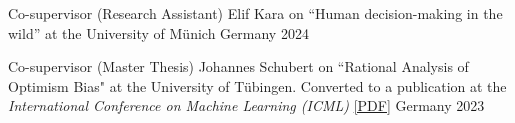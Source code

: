 
\begin{cvhonors}

  \cvhonor
    {Co-supervisor (Research Assistant)} %
    {Elif Kara on ``Human decision-making in the wild'' at the University of Münich} %
    {Germany} %
    {2024} %

  \cvhonor
    {Co-supervisor (Master Thesis)} %
    {Johannes Schubert on ``Rational Analysis of Optimism Bias" at the University of Tübingen. Converted to a publication at the \textit{International Conference on Machine Learning (ICML)}  \href{https://arxiv.org/pdf/2402.01821.pdf}{[PDF]}} %
    {Germany} %
    {2023} %

    \\
\end{cvhonors}
